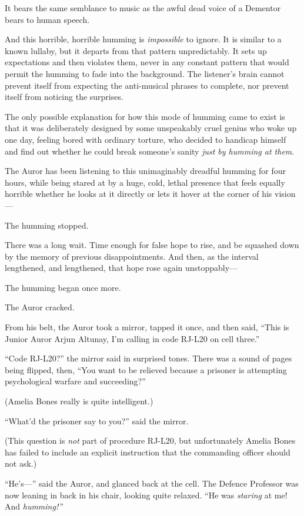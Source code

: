It bears the same semblance to music as the awful dead voice of a
Dementor bears to human speech.

And this horrible, horrible humming is \emph{impossible} to ignore. It
is similar to a known lullaby, but it departs from that pattern
unpredictably. It sets up expectations and then violates them, never in
any constant pattern that would permit the humming to fade into the
background. The listener's brain cannot prevent itself from expecting
the anti-musical phrases to complete, nor prevent itself from noticing
the surprises.

The only possible explanation for how this mode of humming came to exist
is that it was deliberately designed by some unspeakably cruel genius
who woke up one day, feeling bored with ordinary torture, who decided to
handicap himself and find out whether he could break someone's sanity
\emph{just by humming at them}.

The Auror has been listening to this unimaginably dreadful humming for
four hours, while being stared at by a huge, cold, lethal presence that
feels equally horrible whether he looks at it directly or lets it hover
at the corner of his vision---

The humming stopped.

There was a long wait. Time enough for false hope to rise, and be
squashed down by the memory of previous disappointments. And then, as
the interval lengthened, and lengthened, that hope rose again
unstoppably---

The humming began once more.

The Auror cracked.

From his belt, the Auror took a mirror, tapped it once, and then said,
``This is Junior Auror Arjun Altunay, I'm calling in code RJ-L20 on cell
three.''

``Code RJ-L20?'' the mirror said in surprised tones. There was a sound
of pages being flipped, then, ``You want to be relieved because a
prisoner is attempting psychological warfare and succeeding?''

(Amelia Bones really is quite intelligent.)

``What'd the prisoner say to you?'' said the mirror.

(This question is \emph{not} part of procedure RJ-L20, but unfortunately
Amelia Bones has failed to include an explicit instruction that the
commanding officer should not ask.)

``He's---'' said the Auror, and glanced back at the cell. The Defence
Professor was now leaning in back in his chair, looking quite relaxed.
``He was \emph{staring} at me! And \emph{humming!''}

